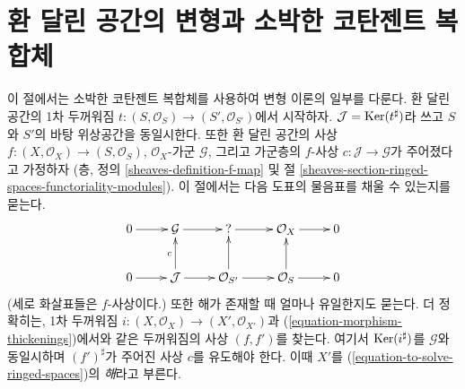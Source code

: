 \section{환 달린 공간의 변형과 소박한 코탄젠트 복합체}
\label{section-deformations-ringed-spaces}

\noindent
이 절에서는 소박한 코탄젠트 복합체를 사용하여 변형 이론의 일부를
다룬다. 환 달린 공간의 1차 두꺼워짐
$t : (S, \mathcal{O}_S) \to (S', \mathcal{O}_{S'})$에서 시작하자.
$\mathcal{J} = \mathop{\mathrm{Ker}}(t^\sharp)$라 쓰고 $S$와 $S'$의 바탕 위상공간을
동일시한다. 또한 환 달린 공간의 사상
$f : (X, \mathcal{O}_X) \to (S, \mathcal{O}_S)$, $\mathcal{O}_X$-가군
$\mathcal{G}$, 그리고 가군층의 $f$-사상
$c : \mathcal{J} \to \mathcal{G}$가 주어졌다고 가정하자
(층, 정의 \ref{sheaves-definition-f-map} 및 절
\ref{sheaves-section-ringed-spaces-functoriality-modules}).
이 절에서는 다음 도표의 물음표를 채울 수 있는지를 묻는다.
\begin{equation}
\label{equation-to-solve-ringed-spaces}
\vcenter{
\xymatrix{
0 \ar[r] & \mathcal{G} \ar[r] & {?} \ar[r] & \mathcal{O}_X \ar[r] & 0 \\
0 \ar[r] & \mathcal{J} \ar[u]^c \ar[r] & \mathcal{O}_{S'} \ar[u] \ar[r] &
\mathcal{O}_S \ar[u] \ar[r] & 0
}
}
\end{equation}
(세로 화살표들은 $f$-사상이다.) 또한 해가 존재할 때 얼마나
유일한지도 묻는다. 더 정확히는, 1차 두꺼워짐
$i : (X, \mathcal{O}_X) \to (X', \mathcal{O}_{X'})$과
(\ref{equation-morphism-thickenings})에서와 같은 두꺼워짐의 사상
$(f, f')$를 찾는다. 여기서 $\mathop{\mathrm{Ker}}(i^\sharp)$를 $\mathcal{G}$와
동일시하며 $(f')^\sharp$가 주어진 사상 $c$를 유도해야 한다.
이때 $X'$를 (\ref{equation-to-solve-ringed-spaces})의 {\it 해}라고
부른다.

